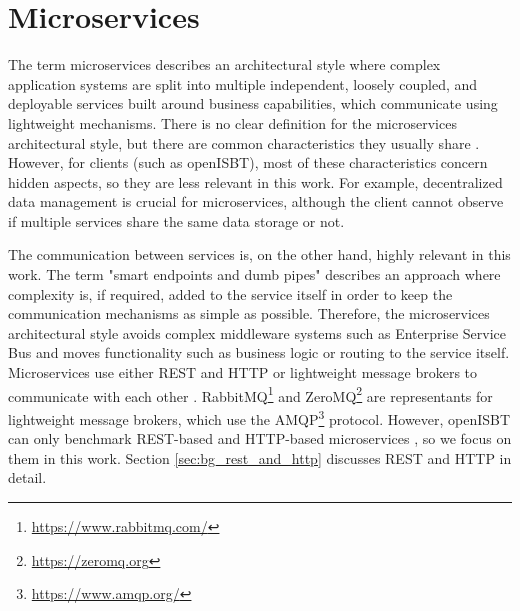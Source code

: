 \section{Microservices}
\label{sec:bg_microservices}

The term microservices describes an architectural style where complex application systems are split into multiple independent, loosely coupled, and deployable services built around business capabilities, which communicate using lightweight mechanisms.
There is no clear definition for the microservices architectural style, but there are common characteristics they usually share \cite{martin_fowler_microservices}. 
However, for clients (such as openISBT), most of these characteristics concern hidden aspects, so they are less relevant in this work. For example, decentralized data management is crucial for microservices, although the client cannot observe if multiple services share the same data storage or not.  

The communication between services is, on the other hand, highly relevant in this work. The term "smart endpoints and dumb pipes" \cite{martin_fowler_microservices} describes an approach where complexity is, if required, added to the service itself in order to keep the communication mechanisms as simple as possible. Therefore, the microservices architectural style avoids complex middleware systems such as Enterprise Service Bus  \cite{Enterprise_service_bus} and moves functionality such as business logic or routing to the service itself.
Microservices use either REST and HTTP or lightweight message brokers to communicate with each other \cite{martin_fowler_microservices}. RabbitMQ\footnote{\url{https://www.rabbitmq.com/}} and ZeroMQ\footnote{\url{https://zeromq.org}} are representants for lightweight message brokers, which use the AMQP\footnote{\url{https://www.amqp.org/}} protocol. However, openISBT can only benchmark REST-based and HTTP-based microservices \cite[][sec. 5]{paper_grambow_benchmarking_microservices}, so we focus on them in this work. Section  \ref{sec:bg_rest_and_http} discusses REST and HTTP in detail. 